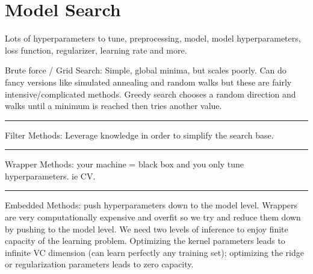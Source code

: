 \documentclass[a4paper,twoside,twocolumn]{article}
\begin{document}
\section*{Model Search}
\label{sec-13}
\setlength{\parindent}{0pt}
{\scriptsize
Lots of hyperparameters to tune, preprocessing, model, model hyperparameters, loss function, regularizer, learning rate and more.

Brute force / Grid Search: Simple, global minima, but scales poorly. Can do fancy versions like simulated annealing and random walks but these are fairly intensive/complicated methods. Greedy search chooses a random direction and walks until a minimum is reached then tries another value.

\noindent\rule{8cm}{0.4pt}

Filter Methods: Leverage knowledge in order to simplify the search base.

\noindent\rule{8cm}{0.4pt}

Wrapper Methods: your machine = black box and you only tune hyperparameters. ie CV.

\noindent\rule{8cm}{0.4pt}

Embedded Methods: push hyperparameters down to the model level. Wrappers are very computationally expensive and overfit so we try and reduce them down by pushing to the model level. We need two levels of inference to enjoy finite capacity of the learning problem. Optimizing the kernel parameters leads to infinite VC dimension (can learn perfectly any training set); optimizing the ridge or regularization parameters leads to zero capacity.

}
\end{document}
